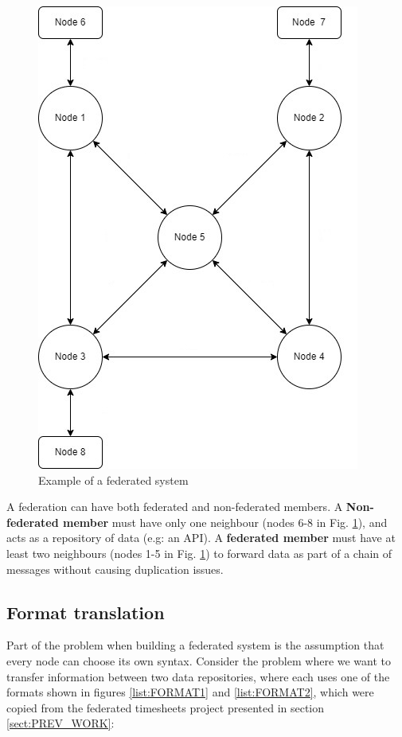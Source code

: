 \documentclass[journal]{IEEEtran}
\begin{document}
\begin{figure}[h]
	\hfill\includegraphics[scale = 0.6]{FEDERATION_1}\hspace*{\fill}
	\caption{Example of a federated system}
	\label{fig:FED1}
\end{figure}

A federation can have both federated and non-federated members. A \textbf {Non-federated member} must have only one neighbour (nodes 6-8 in Fig. \ref{fig:FED1}), and acts as a repository of data (e.g: an API). A \textbf{federated member} must have at least two neighbours (nodes 1-5 in Fig. \ref{fig:FED1}) to forward data as part of a chain of messages without causing duplication issues.

\subsection{Format translation} \label{sect:FORMAT_TRANSLATION}

Part of the problem when building a federated system is the assumption that every node can choose its own syntax. Consider the problem where we want to transfer information between two data repositories, where each uses one of the formats shown in figures \ref{list:FORMAT1} and \ref{list:FORMAT2}, which were copied from the federated timesheets project presented in section \ref{sect:PREV_WORK}:
\end{document}
